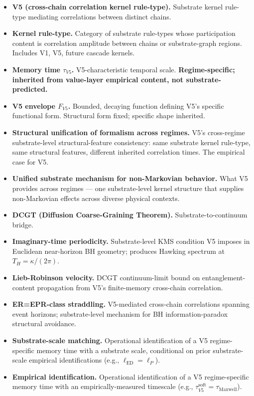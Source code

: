 \documentclass[11pt,a4paper]{article}
\begin{document}
\begin{itemize}[noitemsep]
\item \textbf{V5 (cross-chain correlation kernel rule-type).} Substrate kernel rule-type mediating correlations between distinct chains.
\item \textbf{Kernel rule-type.} Category of substrate rule-types whose participation content is correlation amplitude between chains or substrate-graph regions. Includes V1, V5, future cascade kernels.
\item \textbf{Memory time $\tau_{V5}$.} V5-characteristic temporal scale. \textbf{Regime-specific; inherited from value-layer empirical content, not substrate-predicted.}
\item \textbf{V5 envelope $F_{V5}$.} Bounded, decaying function defining V5's specific functional form. Structural form fixed; specific shape inherited.
\item \textbf{Structural unification of formalism across regimes.} V5's cross-regime substrate-level structural-feature consistency: same substrate kernel rule-type, same structural features, different inherited correlation times. The empirical case for V5.
\item \textbf{Unified substrate mechanism for non-Markovian behavior.} What V5 provides across regimes --- one substrate-level kernel structure that supplies non-Markovian effects across diverse physical contexts.
\item \textbf{DCGT (Diffusion Coarse-Graining Theorem).} Substrate-to-continuum bridge.
\item \textbf{Imaginary-time periodicity.} Substrate-level KMS condition V5 imposes in Euclidean near-horizon BH geometry; produces Hawking spectrum at $T_H = \kappa/(2\pi)$.
\item \textbf{Lieb-Robinson velocity.} DCGT continuum-limit bound on entanglement-content propagation from V5's finite-memory cross-chain correlation.
\item \textbf{ER=EPR-class straddling.} V5-mediated cross-chain correlations spanning event horizons; substrate-level mechanism for BH information-paradox structural avoidance.
\item \textbf{Substrate-scale matching.} Operational identification of a V5 regime-specific memory time with a substrate scale, conditional on prior substrate-scale empirical identifications (e.g., $\ell_\mathrm{ED} = \ell_P$).
\item \textbf{Empirical identification.} Operational identification of a V5 regime-specific memory time with an empirically-measured timescale (e.g., $\tau_{V5}^\mathrm{soft} = \tau_\mathrm{Maxwell}$).
\end{itemize}
\end{document}
